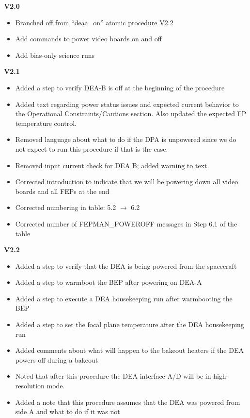 \documentclass[11pt]{article}
\begin{document}
{\bf V2.0}
\begin{itemize}
\item Branched off from ``deaa\_on'' atomic procedure V2.2
\item Add commands to power video boards on and off
\item Add bias-only science runs
\end{itemize}

{\bf V2.1}
\begin{itemize}
\item Added a step to verify DEA-B is off at the beginning of the procedure
\item Added text regarding power status issues and expected current behavior to the Operational Constraints/Cautions section. Also updated the expected FP temperature control.
\item Removed language about what to do if the DPA is unpowered since we do not expect to run this procedure if that is the case.
\item Removed input current check for DEA B; added warning to text.
\item Corrected introduction to indicate that we will be powering down all video boards and all FEPs at the end
\item Corrected numbering in table: 5.2 $\rightarrow$ 6.2
\item Corrected number of FEPMAN\_POWEROFF messages in Step 6.1 of the table
\end{itemize}

{\bf V2.2}
\begin{itemize}
\item Added a step to verify that the DEA is being powered from the spacecraft
\item Added a step to warmboot the BEP after powering on DEA-A
\item Added a step to execute a DEA housekeeping run after warmbooting the BEP
\item Added a step to set the focal plane temperature after the DEA housekeeping run
\item Added comments about what will happen to the bakeout heaters if the DEA powers off during a bakeout
\item Noted that after this procedure the DEA interface A/D will be in high-resolution mode. 
\item Added a note that this procedure assumes that the DEA was powered from side A and what to do if it was not
\end{itemize}
\end{document}
